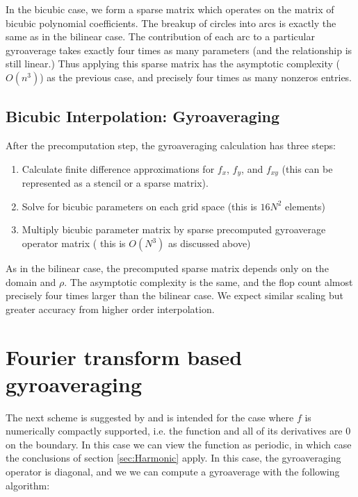 In the bicubic case, we form a sparse matrix which operates on the matrix of bicubic polynomial coefficients.  The breakup of circles into arcs is exactly the same as in the bilinear case.  The contribution of each arc to a particular gyroaverage takes exactly four times as many parameters (and the relationship is still linear.)  Thus applying this sparse matrix has the asymptotic complexity ($O(n^3)$) as the previous case, and precisely four times as many nonzeros entries.  

\subsection{Bicubic Interpolation:  Gyroaveraging}
After the precomputation step, the gyroaveraging calculation has three steps:
\begin{enumerate}
	\item Calculate finite difference approximations for $f_x$, $f_y$, and $f_{xy}$ (this can be represented as a stencil or a sparse matrix).  
	\item Solve for bicubic parameters on each grid space (this is $16N^2$ elements)
	\item Multiply bicubic parameter matrix by sparse precomputed gyroaverage operator matrix ( this is $O(N^3)$ as discussed above)
\end{enumerate}
As in the bilinear case, the precomputed sparse matrix depends only on the domain and $\rho$.  The asymptotic complexity is the same, and the flop count almost precisely four times larger than the bilinear case.  We expect similar scaling but greater accuracy from higher order interpolation.  

\section{Fourier transform based gyroaveraging}
The next scheme is suggested by \cite{vicoFast}
and is intended for the case where $f$ is numerically compactly supported, i.e. the function and all of its derivatives are 0 on the boundary.  In this case we can view the function as periodic, in which case the conclusions of section \ref{sec:Harmonic} apply.  
In this case, the gyroaveraging operator is diagonal, and we we can compute a gyroaverage with the following algorithm:  

